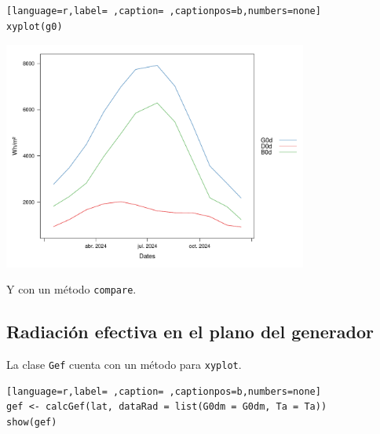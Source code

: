 \begin{lstlisting}[language=r,label= ,caption= ,captionpos=b,numbers=none]
xyplot(g0)
\end{lstlisting}
\begin{center}
\includegraphics[keepaspectratio,width=0.75\textwidth,height=0.5\textheight]{figuras/codigo-g0.pdf}
\end{center}

Y con un método \texttt{compare}.


\subsection{Radiación efectiva en el plano del generador}
\label{sec:org4acff9b}
La clase \texttt{Gef} cuenta con un método para \texttt{xyplot}.
\begin{lstlisting}[language=r,label= ,caption= ,captionpos=b,numbers=none]
gef <- calcGef(lat, dataRad = list(G0dm = G0dm, Ta = Ta))
show(gef)
\end{lstlisting}

